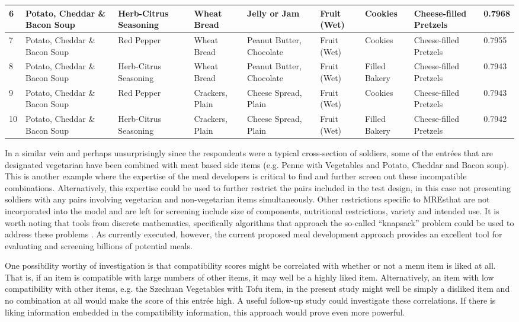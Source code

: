 \begin{landscape}
\begin{longtable}{p{0.5cm}p{4cm}p{4cm}p{2cm}p{2.3cm}p{0.8cm}p{1.5cm}p{2.2cm}p{0.8cm}}
6 & Potato, Cheddar \& Bacon Soup & Herb-Citrus Seasoning & Wheat Bread & Jelly or Jam & Fruit (Wet) & Cookies & Cheese-filled Pretzels & 0.7968\\
\midrule
7 & Potato, Cheddar \& Bacon Soup & Red Pepper & Wheat Bread & Peanut Butter, Chocolate & Fruit (Wet) & Cookies & Cheese-filled Pretzels & 0.7955\\
\midrule
8 & Potato, Cheddar \& Bacon Soup & Herb-Citrus Seasoning & Wheat Bread & Peanut Butter, Chocolate & Fruit (Wet) & Filled Bakery & Cheese-filled Pretzels & 0.7943\\
\midrule
9 & Potato, Cheddar \& Bacon Soup & Red Pepper & Crackers, Plain & Cheese Spread, Plain & Fruit (Wet) & Cookies & Cheese-filled Pretzels & 0.7943\\
\midrule
10 & Potato, Cheddar \& Bacon Soup & Herb-Citrus Seasoning & Crackers, Plain & Cheese Spread, Plain & Fruit (Wet) & Filled Bakery & Cheese-filled Pretzels & 0.7942\\
\end{longtable}
\end{landscape}

In a similar vein and perhaps unsurprisingly since the respondents were a typical cross-section of soldiers, some of the entrées that are designated vegetarian have been combined with meat based side items (e.g. Penne with Vegetables and Potato, Cheddar and Bacon soup).  This is another example where the expertise of the meal developers is critical to find and further screen out these incompatible combinations.  Alternatively, this expertise could be used to further restrict the pairs included in the test design, in this case not presenting soldiers with any pairs involving vegetarian and non-vegetarian items simultaneously.  Other restrictions specific to MREs\tm that are not incorporated into the model and are left for screening include size of components, nutritional restrictions, variety  and intended use.  It is worth noting that tools from discrete mathematics, specifically algorithms that approach the so-called “knapsack” problem could be used to address these problems \citep{Martello1990}.  As currently executed, however, the current proposed meal development approach provides an excellent tool for evaluating and screening billions of potential meals.

One possibility worthy of investigation is that compatibility scores  might be correlated with whether or not a menu item is liked at all.  That is, if an item is compatible with large numbers of other items, it may well be a highly liked item.  Alternatively, an item with low compatibility with other items, e.g. the Szechuan Vegetables with Tofu item, in the present study might well be simply a disliked item and no combination at all would make the score of this entrée high.  A useful follow-up study could investigate these correlations.  If there is liking information embedded in the compatibility information, this approach would prove even more powerful.

